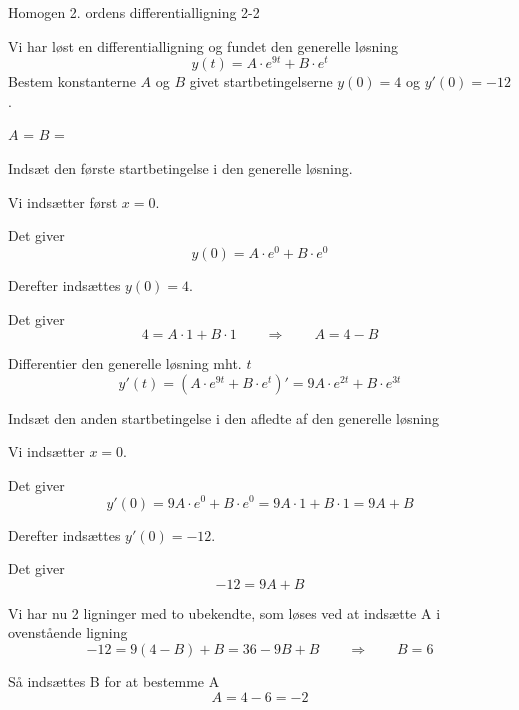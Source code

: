 \documentclass{article}
\begin{document}
\begin{exercise}{Homogen 2. ordens differentialligning 2-2}

Vi har løst en differentialligning og fundet den generelle løsning
\[
y(t) = A \cdot e^{9t} + B \cdot e^{t}
\]
Bestem konstanterne $A$ og $B$ givet startbetingelserne $y(0)=4$ og $y'(0)=-12$.


$A$ = 
$B$ = 

\hint

Indsæt den første startbetingelse i den generelle løsning.


\hint

Vi indsætter først $x=0$.

\hint

Det giver
\[
y(0)= A \cdot e^{0} + B \cdot e^{0}
\]

\hint

Derefter indsættes $y(0)=4$.

\hint

Det giver
\[
4= A \cdot 1 + B \cdot 1 \qquad \Rightarrow \qquad A = 4 - B
\]

\hint

Differentier den generelle løsning mht. $t$
\[
y'(t)= \left(A \cdot e^{9t} + B \cdot e^{t} \right)' = 9A \cdot e^{2t} + B \cdot e^{3t}
\]

\hint

Indsæt den anden startbetingelse i den afledte af den generelle løsning

\hint

Vi indsætter $x=0$.

\hint

Det giver
\[
y'(0) = 9A \cdot e^{0} + B \cdot e^{0} = 9A \cdot 1 + B \cdot 1 = 9A + B
\]

\hint

Derefter indsættes $y'(0)=-12$.
\hint

Det giver
\[
-12 = 9A+ B
\]

\hint

Vi har nu 2 ligninger med to ubekendte, som løses ved at indsætte A i ovenstående ligning
\[
-12 = 9(4 - B) + B = 36 - 9B + B \qquad \Rightarrow \qquad B = 6
\]

\hint

Så indsættes B for at bestemme A
\[
A = 4 - 6 = -2
\]

\end{exercise}


\newpage
\end{document}
